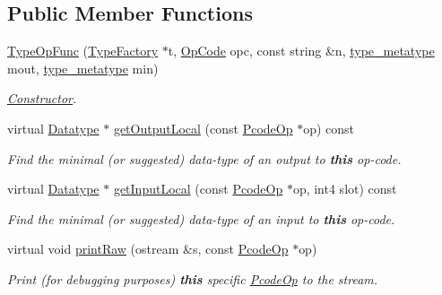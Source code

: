 \subsection*{Public Member Functions}
\begin{DoxyCompactItemize}
\item 
\mbox{\hyperlink{class_type_op_func_a2b4e7d7a31d4ce3d36c8753dbda577d1}{Type\+Op\+Func}} (\mbox{\hyperlink{class_type_factory}{Type\+Factory}} $\ast$t, \mbox{\hyperlink{opcodes_8hh_abeb7dfb0e9e2b3114e240a405d046ea7}{Op\+Code}} opc, const string \&n, \mbox{\hyperlink{type_8hh_aef6429f2523cdf4d415ba04a0209e61f}{type\+\_\+metatype}} mout, \mbox{\hyperlink{type_8hh_aef6429f2523cdf4d415ba04a0209e61f}{type\+\_\+metatype}} min)
\begin{DoxyCompactList}\small\item\em \mbox{\hyperlink{class_constructor}{Constructor}}. \end{DoxyCompactList}\item 
virtual \mbox{\hyperlink{class_datatype}{Datatype}} $\ast$ \mbox{\hyperlink{class_type_op_func_a279fd2e0aaf14e6a15bb12548cd3cc69}{get\+Output\+Local}} (const \mbox{\hyperlink{class_pcode_op}{Pcode\+Op}} $\ast$op) const
\begin{DoxyCompactList}\small\item\em Find the minimal (or suggested) data-\/type of an output to {\bfseries{this}} op-\/code. \end{DoxyCompactList}\item 
virtual \mbox{\hyperlink{class_datatype}{Datatype}} $\ast$ \mbox{\hyperlink{class_type_op_func_a7f2860d7c345a794c665f72dbc41c44d}{get\+Input\+Local}} (const \mbox{\hyperlink{class_pcode_op}{Pcode\+Op}} $\ast$op, int4 slot) const
\begin{DoxyCompactList}\small\item\em Find the minimal (or suggested) data-\/type of an input to {\bfseries{this}} op-\/code. \end{DoxyCompactList}\item 
virtual void \mbox{\hyperlink{class_type_op_func_a8cf3e73be10b60b04b275168d574e58b}{print\+Raw}} (ostream \&s, const \mbox{\hyperlink{class_pcode_op}{Pcode\+Op}} $\ast$op)
\begin{DoxyCompactList}\small\item\em Print (for debugging purposes) {\bfseries{this}} specific \mbox{\hyperlink{class_pcode_op}{Pcode\+Op}} to the stream. \end{DoxyCompactList}\end{DoxyCompactItemize}
